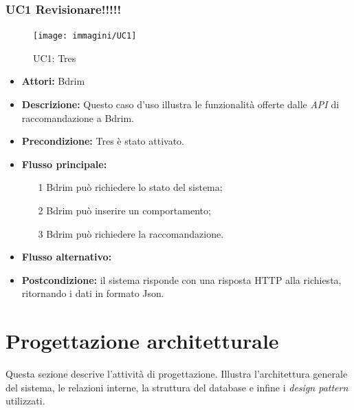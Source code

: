 \subsubsection{UC1 Revisionare!!!!!}
\begin{figure}[h]
\centering
\texttt{[image: immagini/UC1]}
\caption{UC1: Tres}
\label{fig:UC1}
\end{figure}
\begin{itemize}
\item \textbf{Attori:} Bdrim
\item \textbf{Descrizione:} Questo caso d'uso illustra le funzionalità offerte dalle \emph{API} di raccomandazione a Bdrim.
\item \textbf{Precondizione:} Tres è stato attivato.
\item \textbf{Flusso principale:}
\begin{itemize}
\item[1] Bdrim può richiedere lo stato del sistema;
\item[2] Bdrim può inserire un comportamento;
\item[3] Bdrim può richiedere la raccomandazione.
\end{itemize}
\item \textbf{Flusso alternativo:}
\item \textbf{Postcondizione:} il sistema risponde con una risposta HTTP alla richiesta, ritornando i dati in formato Json.
\end{itemize}




\section{Progettazione architetturale}
Questa sezione descrive l'attività di progettazione. Illustra l'architettura generale del sistema, le relazioni interne, la struttura del database e infine i \emph{design pattern} utilizzati.
